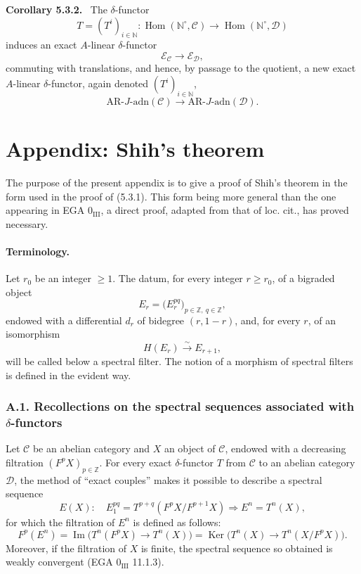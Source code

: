 \documentclass[11pt]{article}
\newenvironment{statement}[1]{\par\medskip\noindent\textbf{#1.}\ }{\par\medskip}
\DeclareMathOperator{\Hom}{Hom}
\providecommand{\Ker}{\operatorname{Ker}}
\providecommand{\Hom}{\operatorname{Hom}}
\providecommand{\Im}{\operatorname{Im}}
\providecommand{\Ker}{\operatorname{Ker}}
\renewcommand{\Im}{\operatorname{Im}}
\providecommand{\Ker}{\operatorname{Ker}}
\providecommand{\Im}{\operatorname{Im}}
\providecommand{\Hom}{\operatorname{Hom}}
\begin{document}
\begin{statement}{Corollary 5.3.2}
The \(\delta\)-functor
\[
T=(T^i)_{i\in\mathbb N}:\Hom(\mathbb N^\circ,\mathcal C)\longrightarrow\Hom(\mathbb N^\circ,\mathcal D)
\]
induces an exact \(A\)-linear \(\delta\)-functor
\[
\mathcal E_{\mathcal C}\longrightarrow\mathcal E_{\mathcal D},
\]
commuting with translations, and hence, by passage to the quotient, a new exact \(A\)-linear \(\delta\)-functor, again denoted \((T^i)_{i\in\mathbb N}\),
\[
\mathrm{AR}\text{-}J\text{-adn}(\mathcal C)\longrightarrow
\mathrm{AR}\text{-}J\text{-adn}(\mathcal D).
\]
\end{statement}

\section*{Appendix: Shih's theorem}

The purpose of the present appendix is to give a proof of Shih's theorem in the form used in the proof of (5.3.1). This form being more general than the one appearing in EGA \(0_{\mathrm{III}}\), a direct proof, adapted from that of loc. cit., has proved necessary.

\paragraph{Terminology.}
Let \(r_0\) be an integer \(\ge1\). The datum, for every integer \(r\ge r_0\), of a bigraded object
\[
E_r=\bigl(E_r^{pq}\bigr)_{p\in\mathbb Z,\ q\in\mathbb Z},
\]
endowed with a differential \(d_r\) of bidegree \((r,1-r)\), and, for every \(r\), of an isomorphism
\[
H(E_r)\xrightarrow{\sim}E_{r+1},
\]
will be called below a spectral filter. The notion of a morphism of spectral filters is defined in the evident way.

\subsubsection*{A.1. Recollections on the spectral sequences associated with \(\delta\)-functors}

Let \(\mathcal C\) be an abelian category and \(X\) an object of \(\mathcal C\), endowed with a decreasing filtration \((F^pX)_{p\in\mathbb Z}\). For every exact \(\delta\)-functor \(T\) from \(\mathcal C\) to an abelian category \(\mathcal D\), the method of “exact couples” makes it possible to describe a spectral sequence
\[
E(X):\quad E_1^{pq}=T^{p+q}(F^pX/F^{p+1}X)\Rightarrow E^n=T^n(X),
\]
for which the filtration of \(E^n\) is defined as follows:
\[
F^p(E^n)=\Im\bigl(T^n(F^pX)\longrightarrow T^n(X)\bigr)
=\Ker\bigl(T^n(X)\longrightarrow T^n(X/F^pX)\bigr).
\]
Moreover, if the filtration of \(X\) is finite, the spectral sequence so obtained is weakly convergent (EGA \(0_{\mathrm{III}}\) 11.1.3).
\end{document}
